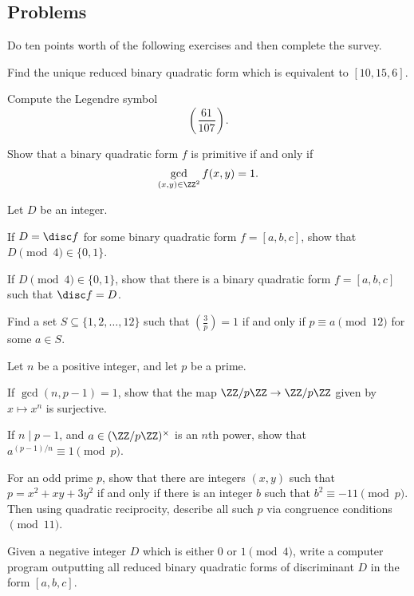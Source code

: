 \documentclass[../notes.tex]{subfiles}
\begin{document}
\subsection{Problems}
Do ten points worth of the following exercises and then complete the survey.
\begin{prob}[1 point]
	Find the unique reduced binary quadratic form which is equivalent to $[10,15,6]$.
\end{prob}
\begin{prob}[2 point]
	Compute the Legendre symbol
	\[\left(\frac{61}{107}\right).\]
\end{prob}
\begin{prob}[2 points] \label{prob:more-intinsic-primitive}
	Show that a binary quadratic form $f$ is primitive if and only if
	\[\gcd_{(x,y)\in\ZZ^2}f(x,y)=1.\]
\end{prob}
\begin{prob}[2 points]
	Let $D$ be an integer.
	\begin{listalph}
		\item If $D=\disc f$ for some binary quadratic form $f=[a,b,c]$, show that $D\pmod4\in\{0,1\}$.
		\item If $D\pmod4\in\{0,1\}$, show that there is a binary quadratic form $f=[a,b,c]$ such that $\disc f=D$.
	\end{listalph}
\end{prob}
\begin{prob}[3 points]
	Find a set $S\subseteq\{1,2,\ldots,12\}$ such that $\left(\frac3p\right)=1$ if and only if $p\equiv a\pmod{12}$ for some $a\in S$.
\end{prob}
\begin{prob}[3 points]
	Let $n$ be a positive integer, and let $p$ be a prime.
	\begin{listalph}
		\item If $\gcd(n,p-1)=1$, show that the map $\ZZ/p\ZZ\to\ZZ/p\ZZ$ given by $x\mapsto x^n$ is surjective.
		\item If $n\mid p-1$, and $a\in(\ZZ/p\ZZ)^\times$ is an $n$th power, show that $a^{(p-1)/n}\equiv1\pmod p$.
	\end{listalph}
\end{prob}
\begin{prob}[5 points]
	For an odd prime $p$, show that there are integers $(x,y)$ such that $p=x^2+xy+3y^2$ if and only if there is an integer $b$ such that $b^2\equiv-11\pmod p$. Then using quadratic reciprocity, describe all such $p$ via congruence conditions$\pmod{11}$.
\end{prob}
\begin{prob}[5 points]
	Given a negative integer $D$ which is either $0$ or $1\pmod4$, write a computer program outputting all reduced binary quadratic forms of discriminant $D$ in the form $[a,b,c]$.
\end{prob}
\end{document}
